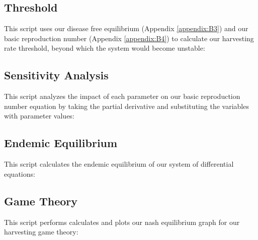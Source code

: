 \documentclass[12pt]{article}
\begin{document}
        \subsection{Threshold}
        \label{appendix:B5}
        This script uses our disease free equilibrium (Appendix \ref{appendix:B3}) and our basic reproduction number (Appendix \ref{appendix:B4}) to calculate our harvesting rate threshold, beyond which the system would become unstable:
        \begin{center}
            
        \end{center}
        
        \subsection{Sensitivity Analysis}
        This script analyzes the impact of each parameter on our basic reproduction number equation by taking the partial derivative and substituting the variables with parameter values:
        \label{appendix:B6}
        \begin{center}
            
        \end{center}
        
        \subsection{Endemic Equilibrium}
        \label{appendix:B7}
        This script calculates the endemic equilibrium of our system of differential equations:        
        \begin{center}
            
        \end{center}
        
        \subsection{Game Theory}
        \label{appendix:B8}
        This script performs calculates and plots our nash equilibrium graph for our harvesting game theory:        
        \begin{center}
            
        \end{center}
\newpage
% 
% 
\printbibliography
\end{document}
